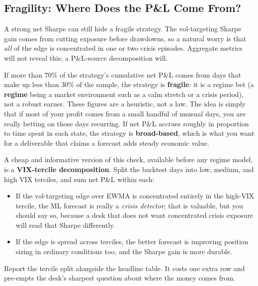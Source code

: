 \subsection{Fragility: Where Does the P\&L Come From?}
\label{subsec:fragility}

A strong net Sharpe can still hide a fragile strategy. The vol-targeting Sharpe gain comes from cutting exposure before drawdowns, so a natural worry is that \emph{all} of the edge is concentrated in one or two crisis episodes. Aggregate metrics will not reveal this; a P\&L-source decomposition will.

\begin{keyidea}
If more than $70\%$ of the strategy's cumulative net P\&L comes from days that make up less than $30\%$ of the sample, the strategy is \textbf{fragile}: it is a regime bet (a \textbf{regime} being a market environment such as a calm stretch or a crisis period), not a robust earner. These figures are a heuristic, not a law. The idea is simply that if most of your profit comes from a small handful of unusual days, you are really betting on those days recurring. If net P\&L accrues roughly in proportion to time spent in each state, the strategy is \textbf{broad-based}, which is what you want for a deliverable that claims a forecast adds steady economic value.
\end{keyidea}

A cheap and informative version of this check, available before any regime model, is a \textbf{VIX-tercile decomposition}. Split the backtest days into low, medium, and high VIX terciles, and sum net P\&L within each:
\begin{itemize}[nosep]
  \item If the vol-targeting edge over EWMA is concentrated entirely in the high-VIX tercile, the ML forecast is really a \emph{crisis detector}; that is valuable, but you should say so, because a desk that does not want concentrated crisis exposure will read that Sharpe differently.
  \item If the edge is spread across terciles, the better forecast is improving position sizing in ordinary conditions too, and the Sharpe gain is more durable.
\end{itemize}
Report the tercile split alongside the headline table. It costs one extra row and pre-empts the desk's sharpest question about where the money comes from.



